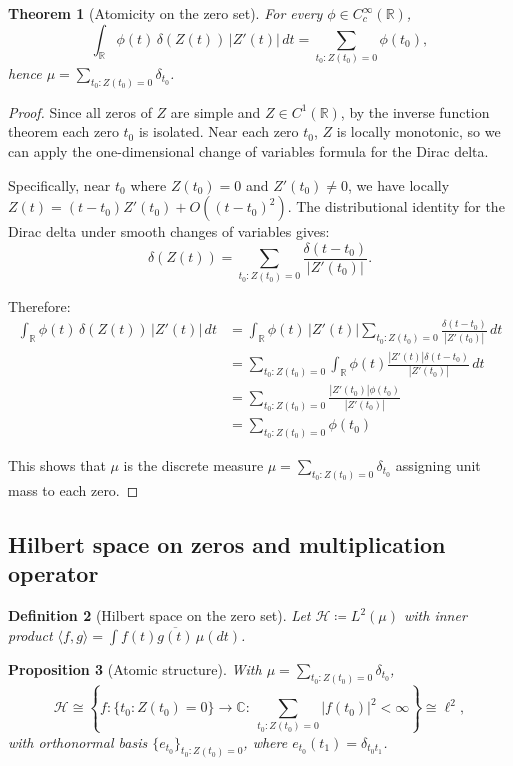\documentclass{article}
\newtheorem{theorem}{Theorem}[section]
\newtheorem{proposition}[theorem]{Proposition}
\newtheorem{definition}[theorem]{Definition}
\begin{document}
\begin{theorem}[Atomicity on the zero set]\label{thm:atomic}
For every $\phi\in C_c^\infty(\mathbb{R})$,
\[
\int_{\mathbb{R}} \phi(t)\,\delta(Z(t))\,|Z'(t)|\,dt=\sum_{t_0:Z(t_0)=0}\phi(t_0),
\]
hence $\mu=\sum_{t_0:Z(t_0)=0}\delta_{t_0}$.
\end{theorem}

\begin{proof}
Since all zeros of $Z$ are simple and $Z\in C^1(\mathbb{R})$, by the inverse function theorem each zero $t_0$ is isolated. Near each zero $t_0$, $Z$ is locally monotonic, so we can apply the one-dimensional change of variables formula for the Dirac delta.

Specifically, near $t_0$ where $Z(t_0)=0$ and $Z'(t_0)\neq 0$, we have locally $Z(t)=(t-t_0)Z'(t_0)+O((t-t_0)^2)$. The distributional identity for the Dirac delta under smooth changes of variables gives:
\[
\delta(Z(t)) = \sum_{t_0:Z(t_0)=0} \frac{\delta(t-t_0)}{|Z'(t_0)|}.
\]

Therefore:
\begin{align}
\int_{\mathbb{R}} \phi(t)\,\delta(Z(t))\,|Z'(t)|\,dt &= \int_{\mathbb{R}} \phi(t)\,|Z'(t)|\sum_{t_0:Z(t_0)=0} \frac{\delta(t-t_0)}{|Z'(t_0)|}\,dt\\
&= \sum_{t_0:Z(t_0)=0} \int_{\mathbb{R}} \phi(t)\frac{|Z'(t)|\delta(t-t_0)}{|Z'(t_0)|}\,dt\\
&= \sum_{t_0:Z(t_0)=0} \frac{|Z'(t_0)|\phi(t_0)}{|Z'(t_0)|}\\
&= \sum_{t_0:Z(t_0)=0} \phi(t_0)
\end{align}

This shows that $\mu$ is the discrete measure $\mu=\sum_{t_0:Z(t_0)=0}\delta_{t_0}$ assigning unit mass to each zero.
\end{proof}

\subsection{Hilbert space on zeros and multiplication operator}
\begin{definition}[Hilbert space on the zero set]\label{def:Hmu}
Let $\mathcal{H}\coloneqq L^2(\mu)$ with inner product $\langle f,g\rangle=\int f(t)\overline{g(t)}\,\mu(dt)$.
\end{definition}

\begin{proposition}[Atomic structure]\label{prop:atomic}
With $\mu=\sum_{t_0:Z(t_0)=0}\delta_{t_0}$,
\[
\mathcal{H}\cong \left\{f:\{t_0:Z(t_0)=0\}\to\mathbb{C}:\ \sum_{t_0:Z(t_0)=0}|f(t_0)|^2<\infty\right\}\cong \ell^2,
\]
with orthonormal basis $\{e_{t_0}\}_{t_0:Z(t_0)=0}$, where $e_{t_0}(t_1)=\delta_{t_0 t_1}$.
\end{proposition}
\end{document}

